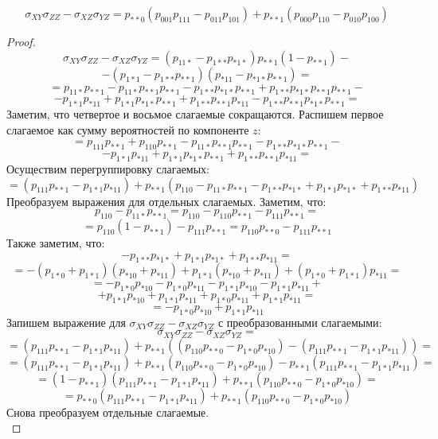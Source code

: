 \begin{lemma}\label{partial_cov}
    $$\sigma_{XY} \sigma_{ZZ} - \sigma_{XZ} \sigma_{YZ} = p_{**0}(p_{001}p_{111}-p_{011}p_{101}) + p_{**1} (p_{000}p_{110}-p_{010}p_{100})$$
\end{lemma}
\begin{proof}
    $$ \sigma_{XY} \sigma_{ZZ} - \sigma_{XZ} \sigma_{YZ}
        = (p_{11*}-p_{1**}p_{*1*}) p_{**1}(1-p_{**1})-
    $$
    $$
        -(p_{1*1}-p_{1**}p_{**1})(p_{*11}-p_{*1*}p_{**1})=
    $$
    $$
        =p_{11*}p_{**1} - p_{11*}p_{**1}p_{**1} - p_{1**}p_{*1*}p_{**1} + p_{1**}p_{*1*}p_{**1}p_{**1}-
    $$
    $$
        -p_{1*1}p_{*11}+p_{1*1}p_{*1*}p_{**1}+p_{1**}p_{**1}p_{*11}-p_{1**}p_{**1}p_{*1*}p_{**1}=
    $$
    Заметим, что четвертое и восьмое слагаемые сокращаются. Распишем первое слагаемое как сумму вероятностей по компоненте $z$:
    $$
        =p_{111}p_{**1}+p_{110}p_{**1} - p_{11*}p_{**1}p_{**1} - p_{1**}p_{*1*}p_{**1} -
    $$
    $$
        -p_{1*1}p_{*11}+p_{1*1}p_{*1*}p_{**1}+p_{1**}p_{**1}p_{*11}=
    $$
    Осуществим перегруппировку слагаемых:
    $$
        =(p_{111}p_{**1}-p_{1*1}p_{*11})+p_{**1}(p_{110}-p_{11*}p_{**1} - p_{1**}p_{*1*} + p_{1*1}p_{*1*} + p_{1**}p_{*11})
    $$
    Преобразуем выражения для отдельных слагаемых.
    Заметим, что:
    $$
        p_{110}-p_{11*}p_{**1}=p_{110}-p_{110}p_{**1}-p_{111}p_{**1}=
    $$
    $$
        =p_{110}(1-p_{**1})-p_{111}p_{**1}=p_{110}p_{**0}-p_{111}p_{**1}
    $$
    Также заметим, что:
    $$
        -p_{1**}p_{*1*} + p_{1*1}p_{*1*} + p_{1**}p_{*11}=
    $$
    $$
        =-(p_{1*0}+p_{1*1})(p_{*10}+p_{*11})+p_{1*1}(p_{*10}+p_{*11}) + (p_{1*0}+p_{1*1})p_{*11}=
    $$
    $$
        =-p_{1*0}p_{*10}-p_{1*0}p_{*11}-p_{1*1}p_{*10}-p_{1*1}p_{*11}+
    $$
    $$
        +p_{1*1}p_{*10}+p_{1*1}p_{*11}+p_{1*0}p_{*11}+p_{1*1}p_{*11}=
    $$
    $$
        =-p_{1*0}p_{*10}+p_{1*1}p_{*11}
    $$
    Запишем выражение для $\sigma_{XY} \sigma_{ZZ} - \sigma_{XZ} \sigma_{YZ}$ с преобразованными слагаемыми:
    $$
    \sigma_{XY} \sigma_{ZZ} - \sigma_{XZ} \sigma_{YZ}=
    $$
    $$
    =(p_{111}p_{**1}-p_{1*1}p_{*11})+p_{**1}((p_{110}p_{**0}-p_{1*0}p_{*10})-(p_{111}p_{**1}-p_{1*1}p_{*11}))=
    $$
    $$
        =(p_{111}p_{**1}-p_{1*1}p_{*11})+p_{**1}(p_{110}p_{**0}-p_{1*0}p_{*10})-p_{**1}(p_{111}p_{**1}-p_{1*1}p_{*11})=
    $$
    $$
        =(1-p_{**1})(p_{111}p_{**1}-p_{1*1}p_{*11})+p_{**1}(p_{110}p_{**0}-p_{1*0}p_{*10})=
    $$
    $$
        =p_{**0}(p_{111}p_{**1}-p_{1*1}p_{*11})+p_{**1}(p_{110}p_{**0}-p_{1*0}p_{*10})
    $$
    Снова преобразуем отдельные слагаемые.
    $$
$$
\end{proof}
